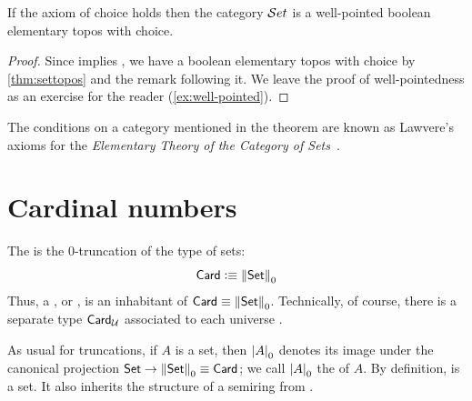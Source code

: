 \begin{thm}\label{thm:ETCS}
  If the axiom of choice holds then the category $\mathcal{S}et$ is a well-pointed boolean elementary topos with choice.
\end{thm}

\begin{proof}
  Since \choice{} implies \LEM{}, we have a boolean elementary topos with choice by \cref{thm:settopos} and the remark following it.  We leave the proof of well-pointedness as
an exercise for the reader (\cref{ex:well-pointed}).
\end{proof}

\begin{rmk}
  The conditions on a category mentioned in the theorem are known as Lawvere's
  axioms for the \emph{Elementary Theory of the Category of Sets}~\cite{lawvere:etcs-long}.
\end{rmk}

\section{Cardinal numbers}
\label{sec:cardinals}

\begin{defn}\label{defn:card}
  The 
  is the 0-truncation of the type \set of sets:
  \[ \mathsf{Card} \vcentcolon\equiv \mathopen{}\left\Vert \mathsf{Set}\right\Vert_{0}\mathclose{} \]
  Thus, a , or , is an inhabitant of $\mathsf{Card}\equiv \mathopen{}\left\Vert \mathsf{Set}\right\Vert_{0}\mathclose{}$.
  Technically, of course, there is a separate type $\mathsf{Card}_\mathcal{U}$ associated to each universe \type.
\end{defn}



As usual for truncations, if $A$ is a set, then $\mathopen{}\left|A\right|_{0}^{}\mathclose{}$ denotes its image under the canonical projection $\mathsf{Set} \to \mathopen{}\left\Vert \mathsf{Set}\right\Vert_{0}\mathclose{} \equiv \mathsf{Card}$; we call $\mathopen{}\left|A\right|_{0}^{}\mathclose{}$ the  of $A$.
By definition, \card is a set.
It also inherits the structure of a semiring from \set.

